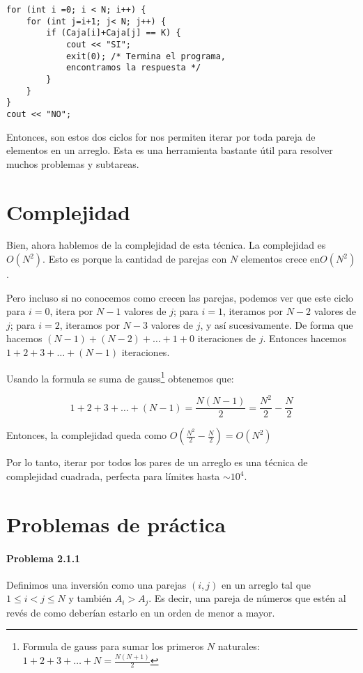 \begin{lstlisting}
for (int i =0; i < N; i++) {
	for (int j=i+1; j< N; j++) {
		if (Caja[i]+Caja[j] == K) {
			cout << "SI";
			exit(0); /* Termina el programa, 
			encontramos la respuesta */
		}
	}
}
cout << "NO";
\end{lstlisting}

Entonces, son estos dos ciclos for nos permiten iterar por toda pareja de elementos en un arreglo. Esta es una herramienta bastante útil para resolver muchos problemas y subtareas.

\section * {Complejidad}
Bien, ahora hablemos de la complejidad de esta técnica. La complejidad es \(O(N^2)\). Esto es porque la cantidad de parejas con \(N\) elementos crece en\(O(N^2)\).

Pero incluso si no conocemos como crecen las parejas, podemos ver que este ciclo para \(i = 0\), itera por \(N-1\) valores de \(j\); para \(i=1\), iteramos por \(N-2\) valores de \(j\); para \(i=2\), iteramos por \(N-3\) valores de \(j\), y así sucesivamente. De forma que hacemos \((N-1)+(N-2)+\ldots+1+0\) iteraciones de \(j\). Entonces hacemos \(1+2+3+\ldots+(N-1)\) iteraciones.

Usando la formula se suma de gauss\footnote{Formula de gauss para sumar los primeros \(N\) naturales: \(1+2+3+\ldots+N=\frac{N(N+1)}{2}\)} obtenemos que:

\[1+2+3+\ldots+(N-1)=\frac{N(N-1)}{2}=\frac{N^2}{2}-\frac{N}{2}\]

Entonces, la complejidad queda como \(O(\frac{N^2}{2}-\frac{N}{2})=O(N^2)\)

Por lo tanto, iterar por todos los pares de un arreglo es una técnica de complejidad cuadrada, perfecta para límites hasta \(\sim{10^4}\).

\newpage
\section*{Problemas de práctica}

\paragraph{Problema 2.1.1} Definimos una inversión como una parejas \((i,j)\) en un arreglo tal que \(1\leq i < j \leq N\) y también \(A_i > A_j\). Es decir, una pareja de números que estén al revés de como deberían estarlo en un orden de menor a mayor.

